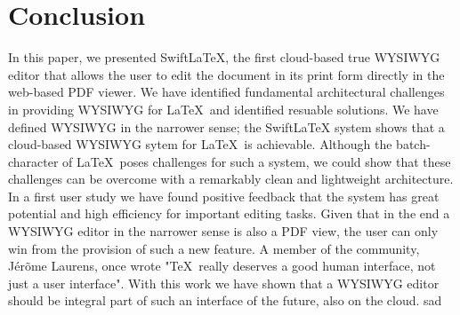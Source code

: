 \documentclass[sigconf]{acmart}
\begin{document}
%


\section{Conclusion}
In this paper, we presented SwiftLaTeX, the first cloud-based true WYSIWYG editor that allows the user to edit the document in its print form directly in the web-based PDF viewer. We have identified fundamental architectural challenges in providing WYSIWYG for \LaTeX\ and identified resuable solutions. We have defined WYSIWYG in the narrower sense; the SwiftLaTeX system shows that a cloud-based WYSIWYG sytem for \LaTeX\ is    achievable. Although the batch-character of \LaTeX\ poses challenges for such a system, we could show that these challenges can be overcome with a remarkably clean and lightweight architecture.
 In a first user study we have found positive feedback that the system has great potential and high efficiency for important editing tasks. Given that in the end a WYSIWYG editor in the narrower sense  is also a PDF view, the user can only win from the provision of such a new feature. A member of the community, J\'er\~ome Laurens, once wrote "\TeX\ really deserves a good human interface, not just a user interface". With this work we have shown that a WYSIWYG editor should be integral part of such an interface of the future, also on the cloud. sad

 



{\footnotesize


} 
\end{document}
